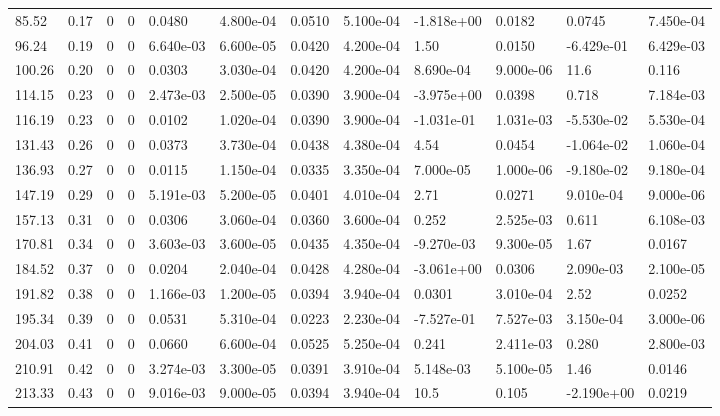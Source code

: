 \documentclass[preview]{standalone}
\begin{document}
{{\begin{tabular}{L{1.2cm}C{1.2cm} C{0.3cm}C{0.5cm} C{1.4cm}C{1.4cm} C{1.4cm}C{1.4cm} C{1.6cm}C{1.6cm} C{1.6cm}C{1.6cm}}
  85.52  &  0.17  & 0     &  0 &  0.0480  & 4.800e-04  &  0.0510&   5.100e-04& -1.818e+00 & 0.0182   &  0.0745 & 7.450e-04  \\ 
  96.24  &  0.19  & 0     &  0 &  6.640e-03  & 6.600e-05  &  0.0420&   4.200e-04& 1.50 & 0.0150   &  -6.429e-01 & 6.429e-03  \\ 
  100.26  &  0.20  & 0     &  0 &  0.0303  & 3.030e-04  &  0.0420&   4.200e-04& 8.690e-04 & 9.000e-06   &  11.6 & 0.116  \\ 
  114.15  &  0.23  & 0     &  0 &  2.473e-03  & 2.500e-05  &  0.0390&   3.900e-04& -3.975e+00 & 0.0398   &  0.718 & 7.184e-03  \\ 
  116.19  &  0.23  & 0     &  0 &  0.0102  & 1.020e-04  &  0.0390&   3.900e-04& -1.031e-01 & 1.031e-03   &  -5.530e-02 & 5.530e-04  \\ 
  131.43  &  0.26  & 0     &  0 &  0.0373  & 3.730e-04  &  0.0438&   4.380e-04& 4.54 & 0.0454   &  -1.064e-02 & 1.060e-04  \\ 
  136.93  &  0.27  & 0     &  0 &  0.0115  & 1.150e-04  &  0.0335&   3.350e-04& 7.000e-05 & 1.000e-06   &  -9.180e-02 & 9.180e-04  \\ 
  147.19  &  0.29  & 0     &  0 &  5.191e-03  & 5.200e-05  &  0.0401&   4.010e-04& 2.71 & 0.0271   &  9.010e-04 & 9.000e-06  \\ 
  157.13  &  0.31  & 0     &  0 &  0.0306  & 3.060e-04  &  0.0360&   3.600e-04& 0.252 & 2.525e-03   &  0.611 & 6.108e-03  \\ 
  170.81  &  0.34  & 0     &  0 &  3.603e-03  & 3.600e-05  &  0.0435&   4.350e-04& -9.270e-03 & 9.300e-05   &  1.67 & 0.0167  \\ 
  184.52  &  0.37  & 0     &  0 &  0.0204  & 2.040e-04  &  0.0428&   4.280e-04& -3.061e+00 & 0.0306   &  2.090e-03 & 2.100e-05  \\ 
  191.82  &  0.38  & 0     &  0 &  1.166e-03  & 1.200e-05  &  0.0394&   3.940e-04& 0.0301 & 3.010e-04   &  2.52 & 0.0252  \\ 
  195.34  &  0.39  & 0     &  0 &  0.0531  & 5.310e-04  &  0.0223&   2.230e-04& -7.527e-01 & 7.527e-03   &  3.150e-04 & 3.000e-06  \\ 
  204.03  &  0.41  & 0     &  0 &  0.0660  & 6.600e-04  &  0.0525&   5.250e-04& 0.241 & 2.411e-03   &  0.280 & 2.800e-03  \\ 
  210.91  &  0.42  & 0     &  0 &  3.274e-03  & 3.300e-05  &  0.0391&   3.910e-04& 5.148e-03 & 5.100e-05   &  1.46 & 0.0146  \\ 
  213.33  &  0.43  & 0     &  0 &  9.016e-03  & 9.000e-05  &  0.0394&   3.940e-04& 10.5 & 0.105   &  -2.190e+00 & 0.0219  \\ 

\end{tabular}}}
\end{document}
